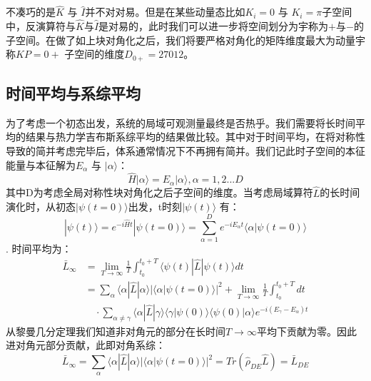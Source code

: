不凑巧的是$\hat{K}$ 与 $\hat{I}$并不对对易。但是在某些动量态比如$K_i=0$ 与 $K_i=\pi$子空间中，反演算符与$\hat{K}$与$\hat{I}$是对易的，此时我们可以进一步将空间划分为宇称为$+$与$-$的子空间。在做了如上块对角化之后，我们将要严格对角化的矩阵维度最大为动量宇称$KP=0+$
子空间的维度$D_{0+}=27012$。


\subsection{时间平均与系综平均}
为了考虑一个初态出发，系统的局域可观测量最终是否热乎。我们需要将长时间平均的结果与热力学吉布斯系综平均的结果做比较。其中对于时间平均，在将对称性导致的简并考虑完毕后，体系通常情况下不再拥有简并。我们记此时子空间的本征能量与本征解为$E_\alpha$ 与 $|\alpha\rangle$：
\begin{equation}
\hat{H} |\alpha\rangle = E_\alpha |\alpha\rangle, \alpha=1,2...D
\end{equation}
其中D为考虑全局对称性块对角化之后子空间的维度。当考虑局域算符$\hat{L}$的长时间演化时，从初态$|\psi(t=0)\rangle$出发，t时刻$|\psi(t)\rangle$ 有：
\begin{equation}
|\psi(t)\rangle = e^{-i\hat{H}t}|\psi(t=0)\rangle = \sum_{\alpha=1}^D e^{-i E_\alpha t} \langle\alpha|\psi(t=0)\rangle
\end{equation}.
时间平均为：
\begin{equation}
\begin{split}
	\bar{L}_{\infty}  &= \lim_{T\to \infty} \frac{1}{T} \int_{t_0}^{t_0+T} \langle\psi(t)|\hat{L}|\psi(t)\rangle dt \\
		\quad &=  \sum_{\alpha} \langle\alpha|\hat{L}|\alpha\rangle |\langle\alpha|\psi(t=0)\rangle|^2  +  \lim_{T\to \infty} \frac{1}{T} \int_{t_0}^{t_0+T} dt \\
		&\quad \cdot\sum_{\alpha\neq\gamma} \langle\alpha|\hat{L}|\gamma\rangle \langle\gamma|\psi(0)\rangle \langle\psi(0)|\alpha\rangle e^{-i(E_\gamma-E_\alpha)t}
\end{split}
\end{equation}
从黎曼几分定理我们知道非对角元的部分在长时间$T\to\infty$平均下贡献为零。因此进对角元部分贡献，此即对角系综：
\begin{equation}
	\bar{L}_{\infty} =  \sum_{\alpha} \langle\alpha|\hat{L}|\alpha\rangle |\langle\alpha|\psi(t=0)\rangle|^2  = Tr(\hat{\rho}_{DE}\hat{L}) = \bar{L}_{DE}
\end{equation}


